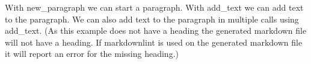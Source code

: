 \documentclass[a4paper]{report}
\begin{document}
With new\_paragraph we can start a paragraph. With add\_text we can add text to the paragraph. We can also add text to the paragraph in multiple calls using add\_text. (As this example does not have a heading the generated markdown file will not have a heading. If markdownlint is used on the generated markdown file it will report an error for the missing heading.)
\end{document}
